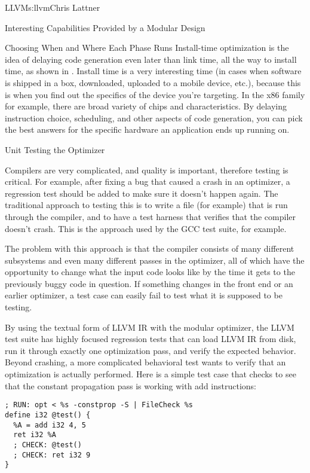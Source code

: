 \begin{aosachapter}{LLVM}{s:llvm}{Chris Lattner}
\begin{aosasect1}{Interesting Capabilities Provided by a Modular Design}
\begin{aosasect2}{Choosing When and Where Each Phase Runs}
Install-time optimization is the idea of delaying code generation even
later than link time, all the way to install time, as shown in
.  Install time is a very interesting time
(in cases when software is shipped in a box, downloaded, uploaded to a
mobile device, etc.), because this is when you find out the specifics
of the device you're targeting.  In the x86 family for example, there
are broad variety of chips and characteristics.  By delaying
instruction choice, scheduling, and other aspects of code generation,
you can pick the best answers for the specific hardware an application
ends up running on.


\end{aosasect2}

\vspace{-.5cm}
\begin{aosasect2}{Unit Testing the Optimizer}

Compilers are very complicated, and quality is important, therefore
testing is critical.  For example, after fixing a bug that caused a
crash in an optimizer, a regression test should be added to make sure
it doesn't happen again.  The traditional approach to testing this is
to write a  file (for example) that is run through the
compiler, and to have a test harness that verifies that the compiler
doesn't crash.  This is the approach used by the GCC test suite, for
example.

The problem with this approach is that the compiler consists of many
different subsystems and even many different passes in the optimizer,
all of which have the opportunity to change what the input code looks
like by the time it gets to the previously buggy code in question.  If
something changes in the front end or an earlier optimizer, a test
case can easily fail to test what it is supposed to be testing.

By using the textual form of LLVM IR with the modular optimizer, the
LLVM test suite has highly focused regression tests that can load LLVM
IR from disk, run it through exactly one optimization pass, and verify
the expected behavior.  Beyond crashing, a more complicated behavioral
test wants to verify that an optimization is actually performed.  Here
is a simple test case that checks to see that the constant propagation
pass is working with add instructions:

\begin{verbatim}
; RUN: opt < %s -constprop -S | FileCheck %s
define i32 @test() {
  %A = add i32 4, 5
  ret i32 %A
  ; CHECK: @test()
  ; CHECK: ret i32 9
}
\end{verbatim}


\end{aosasect2}
\end{aosasect1}
\end{aosachapter}
